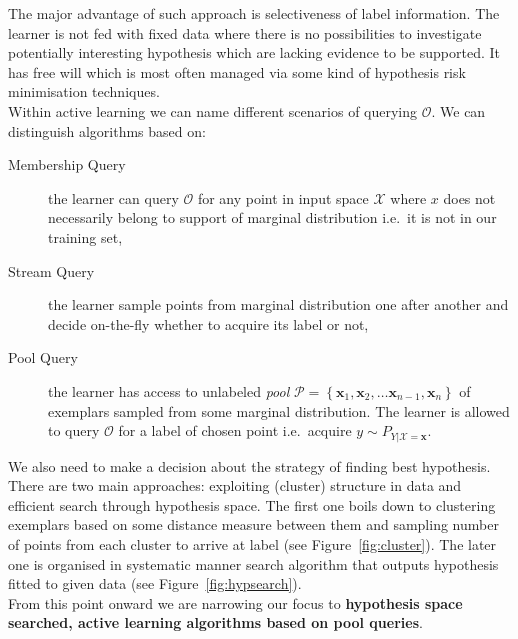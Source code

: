 \documentclass[12pt, a4paper, pdflatex, leqno]{report}
\begin{document}
The major advantage of such approach is selectiveness of label information. The learner is not fed with fixed data where there is no possibilities to investigate potentially interesting hypothesis which are lacking evidence to be supported. It has free will which is most often managed via some kind of hypothesis risk minimisation techniques.\\

Within active learning we can name different scenarios of querying $\mathscr{O}$. We can distinguish algorithms based on:
\begin{description}
\item[Membership Query] the learner can query $\mathscr{O}$ for any point in input space $\mathscr{X}$ where $x$ does not necessarily belong to support of marginal distribution i.e.\ it is not in our training set,
\item[Stream Query] the learner sample points from marginal distribution one after another and decide on-the-fly whether to acquire its label or not,
\item[Pool Query] the learner has access to unlabeled \emph{pool} $\mathscr{P} = \left\{ \mathbf{x}_1, \mathbf{x}_2, \dots \mathbf{x}_{n-1}, \mathbf{x}_n \right\}$ of exemplars sampled from some marginal distribution. The learner is allowed to query $\mathscr{O}$ for a label of chosen point i.e.\ acquire $y \sim P_{Y|\mathscr{X} = \mathbf{x}}$.\\
\end{description}

We also need to make a decision about the strategy of finding best hypothesis. There are two main approaches: exploiting (cluster) structure in data and efficient search through hypothesis space. The first one boils down to clustering exemplars based on some distance measure between them and sampling number of points from each cluster to arrive at label (see Figure~\ref{fig:cluster}). The later one is organised in systematic manner search algorithm that outputs hypothesis fitted to given data (see Figure~\ref{fig:hypsearch}).\\

From this point onward we are narrowing our focus to \textbf{hypothesis space searched, active learning algorithms based on pool queries}.\\
\end{document}
